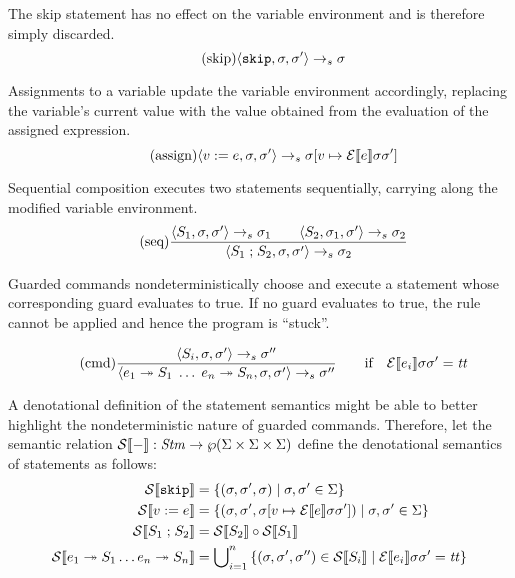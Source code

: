 \documentclass[a4paper,10pt,english]{article}
\begin{document}
The skip statement has no effect on the variable environment and is therefore simply discarded.
\begin{equation*}
	\tag{skip}
	\langle \mathtt{skip}, \sigma, \sigma' \rangle
		\rightarrow_s
	\sigma
\end{equation*}

Assignments to a variable update the variable environment accordingly, replacing the variable's current value with the value
obtained from the evaluation of the assigned expression.
\begin{equation*}
	\tag{assign}
	\langle v\; \mathtt{:=}\; e, \sigma, \sigma' \rangle
		\rightarrow_s
	\sigma[v \mapsto \mathcal{E} \llbracket e \rrbracket \sigma \sigma']
\end{equation*}

Sequential composition executes two statements sequentially, carrying along the modified variable environment.
\begin{equation*}
	\tag{seq}
	\dfrac
	{
		\langle S_1, \sigma, \sigma' \rangle
			\rightarrow_s
		\sigma_1
		\qquad
		\langle S_2, \sigma_1, \sigma' \rangle
			\rightarrow_s
		\sigma_2
	}
	{
		\langle S_1 \; \mathtt{;} \; S_2, \sigma, \sigma' \rangle
			\rightarrow_s
		\sigma_2
	}
\end{equation*}

Guarded commands nondeterministically choose and execute a statement whose corresponding guard evaluates to true. If no guard
evaluates to true, the rule cannot be applied and hence the program is ``stuck''.

\begin{equation*}
	\tag{cmd}
	\dfrac
	{
		\langle S_i, \sigma, \sigma' \rangle
			\rightarrow_s
		\sigma''
	}
	{
		\langle e_1 \; \mathtt{\twoheadrightarrow} \; S_1 \; \ldots \; e_n \; \mathtt{\twoheadrightarrow} \; S_n, \sigma, \sigma' \rangle
			\rightarrow_s
		\sigma''
	}
	\qquad \text{if} \quad \mathcal{E} \llbracket e_i \rrbracket \sigma \sigma' = \mathit{tt}
\end{equation*}

A denotational definition of the statement semantics might be able to better highlight the nondeterministic nature of guarded
commands. Therefore, let the semantic relation $\mathcal{S} \llbracket - \rrbracket : \mathit{Stm} \rightarrow \wp (\Sigma \times \Sigma \times \Sigma)$
define the denotational semantics of statements as follows:
\begin{align*}
	\mathcal{S} \llbracket \mathtt{skip} \rrbracket &= \{ (\sigma, \sigma', \sigma) \mid \sigma, \sigma' \in \Sigma \}
	\\
	\mathcal{S} \llbracket v\; \mathtt{:=}\; e \rrbracket &= \{ (\sigma, \sigma', \sigma[v \mapsto \mathcal{E} \llbracket e \rrbracket \sigma \sigma']) \mid
	\sigma, \sigma' \in \Sigma \}
	\\
	\mathcal{S} \llbracket S_1 \; \mathtt{;} \; S_2 \rrbracket &= \mathcal{S} \llbracket S_2 \rrbracket \circ \mathcal{S} \llbracket S_1 \rrbracket
	\\
	\mathcal{S} \llbracket e_1 \; \mathtt{\twoheadrightarrow} \; S_1 \ldots e_n \; \mathtt{\twoheadrightarrow} \; S_n \rrbracket &= 
		\bigcup\nolimits_{i = 1}^n \,
		\{ (\sigma, \sigma', \sigma'') \in \mathcal{S} \llbracket S_i \rrbracket \mid \mathcal{E} \llbracket e_i \rrbracket \sigma \sigma' = \mathit{tt} \}
\end{align*}
\end{document}
